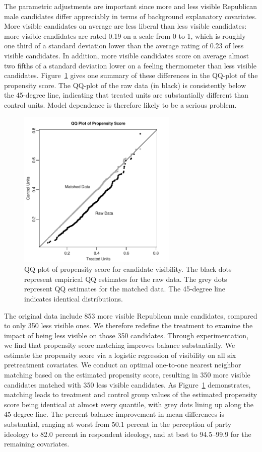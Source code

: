 \documentclass[11pt,titlepage]{article}
\begin{document}
The parametric adjustments are important since more and less visible
Republican male candidates differ appreciably in terms of background
explanatory covariates.  More visible candidates on average are less
liberal than less visible candidates: more visible candidates are
rated 0.19 on a scale from 0 to 1, which is roughly one third of a
standard deviation lower than the average rating of 0.23 of less
visible candidates.  In addition, more visible candidates score on average
almost two fifths of a standard
deviation lower on a feeling thermometer than less visible candidates.  Figure~\ref{fg:kochQQ}
gives one summary of these differences in the QQ-plot of the
propensity score.  The QQ-plot of the raw data (in black) is
consistently below the 45-degree line, indicating that treated units
are substantially different than control units.  Model dependence is
therefore likely to be a serious problem.
\begin{figure}[t] 
 \begin{center}
   \includegraphics[height=3in,angle=0]{figs/kochqq.pdf}
 \end{center} 
 \vspace{-0.275in}
 \caption{QQ plot of propensity score for candidate visibility. The
   black dots represent empirical QQ estimates for the raw data.  The
   grey dots represent QQ estimates for the matched data.  The
   45-degree line indicates identical distributions.}
 \label{fg:kochQQ}
\end{figure}

The original data include 853 more visible Republican male candidates,
compared to only 350 less visible ones.  We therefore redefine the
treatment to examine the impact of being less visible on those 350
candidates.  Through experimentation, we find that propensity score
matching improves balance substantially.  We estimate the propensity
score via a logistic regression of visibility on all six pretreatment
covariates.  We conduct an optimal one-to-one nearest neighbor
matching based on the estimated propensity score, resulting in 350
more visible candidates matched with 350 less visible candidates.  As
Figure~\ref{fg:kochQQ} demonstrates, matching leads to treatment and
control group values of the estimated propensity score being identical
at almost every quantile, with grey dots lining up along the 45-degree
line.  The percent balance improvement in mean differences is
substantial, ranging at worst from 50.1 percent in the perception of
party ideology to 82.0 percent in respondent ideology, and at best to
94.5--99.9 for the remaining covariates.
\end{document}
